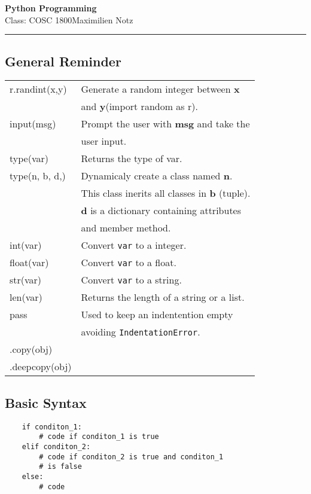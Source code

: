 \documentclass[5pt]{article}
\begin{document}
\begin{center}
     \Large{\textbf{Python Programming}}\\
     \small{Class: COSC 1800}\hfill\small{\textcopyright Maximilien Notz \the\year{}}
     \noindent\rule{20.2cm}{0.4pt}
\end{center}


\begin{multicols}{2}
\setcounter{secnumdepth}{0}

\subsection{General Reminder}
\begin{tabular}{>{\ttfamily}l l}
    r.randint(x,y)      & Generate a random integer between \textbf{x}\\
                        & and \textbf{y}(import random as r).\\
    input(msg)          & Prompt the user with \textbf{msg} and take the\\
                        & user input.\\
    type(var)           & Returns the type of var.\\
    type(n, b, d,)      & Dynamicaly create a class named \textbf{n}.\\
                        & This class inerits all classes in \textbf{b} (tuple).\\
                        & \textbf{d} is a dictionary containing attributes\\
                        & and member method.\\
    int(var)            & Convert \texttt{var} to a integer.\\
    float(var)          & Convert \texttt{var} to a float.\\
    str(var)            & Convert \texttt{var} to a string.\\
    len(var)            & Returns the length of a string or a list.\\
    pass                & Used to keep an indentention empty\\
                        & avoiding \texttt{IndentationError}.\\
    .copy(obj)          & \\
    .deepcopy(obj)      & \\
\end{tabular}

\subsection{Basic Syntax}
\begin{verbatim}
    if conditon_1:
        # code if conditon_1 is true
    elif conditon_2:
        # code if conditon_2 is true and conditon_1 
        # is false
    else:
        # code
\end{verbatim}


\end{multicols}
\end{document}
